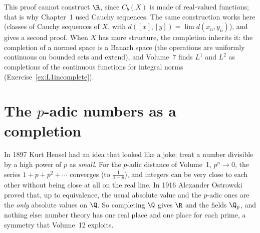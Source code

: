 This proof cannot construct $\R$, since $C_b(X)$ is made of real-valued functions; that is why Chapter~1 used Cauchy
sequences. The same construction works here (classes of Cauchy sequences of $X$, with $d([x],[y])=\lim d(x_n,y_n)$), and gives a
second proof. When $X$ has more structure, the completion inherits it: the completion of a normed space is a Banach space
(the operations are uniformly continuous on bounded sets and extend), and Volume~7 finds $L^1$ and $L^2$ as completions of the
continuous functions for integral norms (Exercise~\ref{ex:L1incomplete}).

\section{The \texorpdfstring{$p$}{p}-adic numbers as a completion}

In 1897 Kurt Hensel had an idea that looked like a joke: treat a number divisible by a high power of $p$ as \emph{small}.
For the $p$-adic distance of Volume~1, $p^n\to0$, the series $1+p+p^2+\cdots$ converges (to $\frac1{1-p}$), and integers can be
very close to each other without being close at all on the real line. In 1916 Alexander Ostrowski proved that, up to
equivalence, the usual absolute value and the $p$-adic ones are the \emph{only} absolute values on $\Q$. So completing $\Q$
gives $\R$ and the fields $\Q_p$, and nothing else: number theory has one real place and one place for each prime, a
symmetry that Volume~12 exploits.


